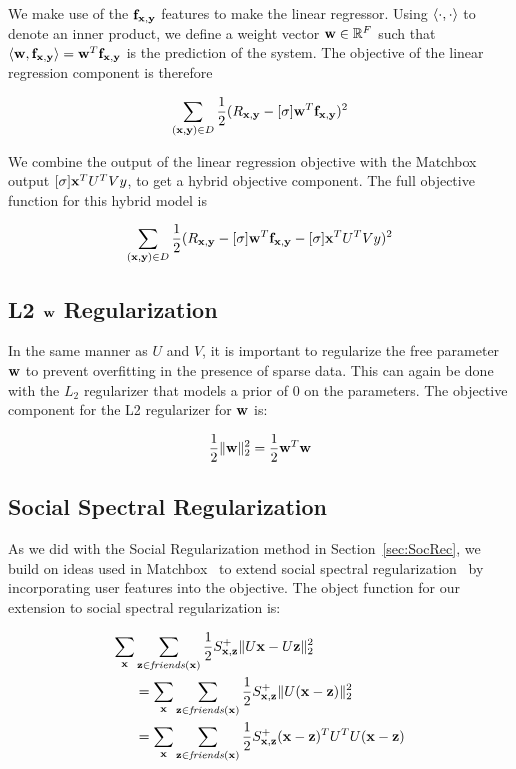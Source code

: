 We make use of the $\mathbf{f}_{\mathbf{x},\mathbf{y}}$ features to make the linear regressor. Using $\langle \cdot,\cdot \rangle$ to denote an inner product, we define a weight
vector $\mathbf{w} \in \mathbb{R}^F$ such that $\langle \mathbf{w}, \mathbf{f}_{\mathbf{x},\mathbf{y}} \rangle = \mathbf{w}^T \mathbf{f}_{\mathbf{x},\mathbf{y}}$ is the prediction of the system. The objective of the linear regression component is therefore

\begin{align*}
\sum_{(\mathbf{x},\mathbf{y}) \in D} \frac{1}{2} (R_{\mathbf{x},\mathbf{y}} - [\sigma] \mathbf{w}^T \mathbf{f}_{\mathbf{x},\mathbf{y}})^2
\end{align*}

We combine the output of the linear regression objective with the Matchbox output $[\sigma] \mathbf{x}^T U^T V y$, to get a hybrid objective component. The full objective function for this hybrid model is

\begin{align}
\sum_{(\mathbf{x},\mathbf{y}) \in D} \frac{1}{2} (R_{\mathbf{x},\mathbf{y}} - [\sigma] \mathbf{w}^T \mathbf{f}_{\mathbf{x},\mathbf{y}} - [\sigma] \mathbf{x}^T U^T V y)^2
\end{align}

\subsection{L2 $\mathbf{w}$ Regularization}

In the same manner as $U$ and $V$, it is important to regularize the free parameter $\mathbf{w}$ to prevent overfitting in
the presence of sparse data. This can again be done with the
$L_2$ regularizer that models a prior of $0$ on the parameters. The objective component for the L2 regularizer for $\mathbf{w}$ is:

\begin{align}
\frac{1}{2} \| \mathbf{w} \|_2^2 = \frac{1}{2} \mathbf{w}^T \mathbf{w}
\end{align}

\subsection{Social Spectral Regularization}

As we did with the Social Regularization method in Section~\ref{sec:SocRec}, we build on ideas used in Matchbox~\cite{matchbox} to extend social spectral regularization~\cite{sr,rrmf} by incorporating user features into the objective. The object function for our extension to social spectral regularization is:

\begin{align}
\sum_{\mathbf{x}} & \sum_{\mathbf{z} \in \mathit{friends}(\mathbf{x})} \frac{1}{2} S^+_{\mathbf{x},\mathbf{z}} \| U\mathbf{x} - U\mathbf{z} \|_2^2 \nonumber \\
& = \sum_{\mathbf{x}} \sum_{\mathbf{z} \in \mathit{friends}(\mathbf{x})} \frac{1}{2} S^+_{\mathbf{x},\mathbf{z}} \| U (\mathbf{x} - \mathbf{z}) \|_2^2 \nonumber \\
& = \sum_{\mathbf{x}} \sum_{\mathbf{z} \in \mathit{friends}(\mathbf{x})} \frac{1}{2} S^+_{\mathbf{x},\mathbf{z}} (\mathbf{x} - \mathbf{z})^T U^T U (\mathbf{x} - \mathbf{z})
\end{align}

